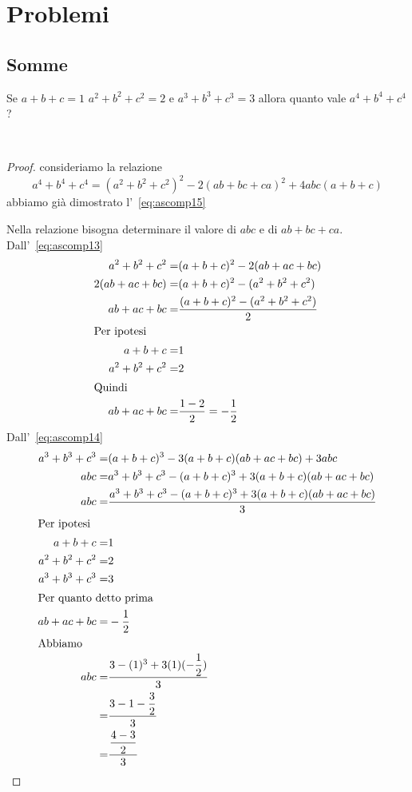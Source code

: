 \chapter{Problemi}
\section{Somme}
\begin{prob}
Se $a+b+c=1$ $a^2+b^2+c^2=2$ e $a^3+b^3+c^3=3$ allora quanto vale $a^4+b^4+c^4$?
\end{prob}~\cite{Gregorio2021}
\begin{proof}
consideriamo la relazione \[a^4+b^4+c^4=(a^2+b^2+c^2)^2-2(ab+bc+ca)^2+4abc(a+b+c)\] abbiamo già dimostrato l'~\vref{eq:ascomp15}

Nella relazione bisogna determinare il valore di $abc$ e di $ab+bc+ca$.
Dall'~\vref{eq:ascomp13}
\begin{align*}
a^2+b^2+c^2=&(a+b+c)^2-2(ab+ac+bc)\\
2(ab+ac+bc)=&(a+b+c)^2-(a^2+b^2+c^2)\\
ab+ac+bc=&\dfrac{(a+b+c)^2-(a^2+b^2+c^2)}{2}\\
\intertext{Per ipotesi}
a+b+c=&1\\
a^2+b^2+c^2=&2\\
\intertext{Quindi}
ab+ac+bc=&\dfrac{1-2}{2}=-\dfrac{1}{2}\\
\end{align*}
Dall'~\vref{eq:ascomp14}
\begin{align*}
	a^3+b^3+c^3=&{}(a+b+c)^3-3(a+b+c)(ab+ac+bc)+3abc\\
	abc=&a^3+b^3+c^3-(a+b+c)^3+3(a+b+c)(ab+ac+bc)\\
	abc=&	\dfrac{a^3+b^3+c^3-(a+b+c)^3+3(a+b+c)(ab+ac+bc)}{3}\\
	\intertext{Per ipotesi}
	a+b+c=&1\\
	a^2+b^2+c^2=&2\\
	a^3+b^3+c^3=&3\\
	\intertext{Per quanto detto prima}
	ab+ac+bc=&-\dfrac{1}{2}\\
	\intertext{Abbiamo}
	abc=&	\dfrac{3-(1)^3+3(1)(-\dfrac{1}{2})}{3}\\
	=&\dfrac{3-1-\dfrac{3}{2}}{3}\\
	=&\dfrac{\dfrac{4-3}{2}}{3}\\
\end{align*}
\end{proof}